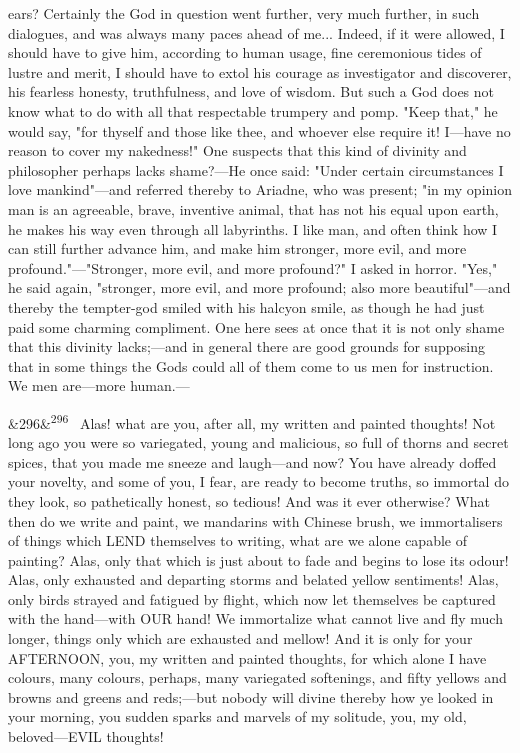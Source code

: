 \documentclass[12pt]{article}
\newcommand{\para}[1][]{\par\noindent\ifx&#1&\else\textsuperscript{\footnotesize #1}~\fi}
\begin{document}
ears? Certainly the God in question went further, very much further, in such dialogues, and was always many paces ahead of me... Indeed, if it were allowed, I should have to give him, according to human usage, fine ceremonious tides of lustre and merit, I should have to extol his courage as investigator and discoverer, his fearless honesty, truthfulness, and love of wisdom. But such a God does not know what to do with all that respectable trumpery and pomp. "Keep that," he would say, "for thyself and those like thee, and whoever else require it! I---have no reason to cover my nakedness!" One suspects that this kind of divinity and philosopher perhaps lacks shame?---He once said: "Under certain circumstances I love mankind"---and referred thereby to Ariadne, who was present; "in my opinion man is an agreeable, brave, inventive animal, that has not his equal upon earth, he makes his way even through all labyrinths. I like man, and often think how I can still further advance him, and make him stronger, more evil, and more profound."---"Stronger, more evil, and more profound?" I asked in horror. "Yes," he said again, "stronger, more evil, and more profound; also more beautiful"---and thereby the tempter-god smiled with his halcyon smile, as though he had just paid some charming compliment. One here sees at once that it is not only shame that this divinity lacks;---and in general there are good grounds for supposing that in some things the Gods could all of them come to us men for instruction. We men are---more human.---

\para[296] Alas! what are you, after all, my written and painted thoughts! Not long ago you were so variegated, young and malicious, so full of thorns and secret spices, that you made me sneeze and laugh---and now? You have already doffed your novelty, and some of you, I fear, are ready to become truths, so immortal do they look, so pathetically honest, so tedious! And was it ever otherwise? What then do we write and paint, we mandarins with Chinese brush, we immortalisers of things which LEND themselves to writing, what are we alone capable of painting? Alas, only that which is just about to fade and begins to lose its odour! Alas, only exhausted and departing storms and belated yellow sentiments! Alas, only birds strayed and fatigued by flight, which now let themselves be captured with the hand---with OUR hand! We immortalize what cannot live and fly much longer, things only which are exhausted and mellow! And it is only for your AFTERNOON, you, my written and painted thoughts, for which alone I have colours, many colours, perhaps, many variegated softenings, and fifty yellows and browns and greens and reds;---but nobody will divine thereby how ye looked in your morning, you sudden sparks and marvels of my solitude, you, my old, beloved---EVIL thoughts!
\end{document}
